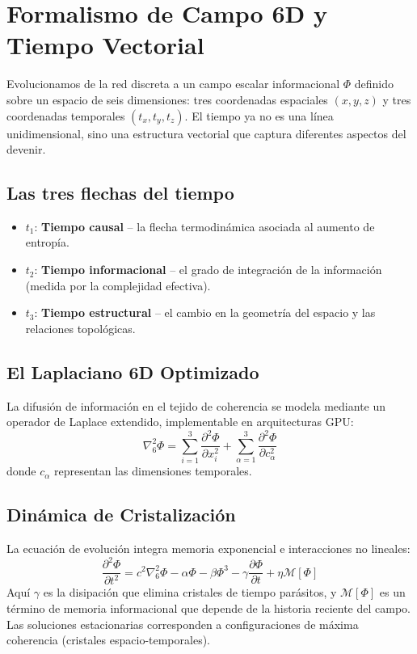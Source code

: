 \chapter{Formalismo de Campo 6D y Tiempo Vectorial}
Evolucionamos de la red discreta a un campo escalar informacional $\Phi$ definido sobre un espacio de seis dimensiones: tres coordenadas espaciales $(x,y,z)$ y tres coordenadas temporales $(t_x, t_y, t_z)$. El tiempo ya no es una línea unidimensional, sino una estructura vectorial que captura diferentes aspectos del devenir.

\section{Las tres flechas del tiempo}
\begin{itemize}
    \item $t_1$: \textbf{Tiempo causal} – la flecha termodinámica asociada al aumento de entropía.
    \item $t_2$: \textbf{Tiempo informacional} – el grado de integración de la información (medida por la complejidad efectiva).
    \item $t_3$: \textbf{Tiempo estructural} – el cambio en la geometría del espacio y las relaciones topológicas.
\end{itemize}

\section{El Laplaciano 6D Optimizado}
La difusión de información en el tejido de coherencia se modela mediante un operador de Laplace extendido, implementable en arquitecturas GPU:
\begin{equation}
\nabla^2_6 \Phi = \sum_{i=1}^{3} \frac{\partial^2 \Phi}{\partial x_i^2} + \sum_{\alpha=1}^{3} \frac{\partial^2 \Phi}{\partial c_\alpha^2}
\end{equation}
donde $c_\alpha$ representan las dimensiones temporales.

\section{Dinámica de Cristalización}
La ecuación de evolución integra memoria exponencial e interacciones no lineales:
\begin{equation}
\frac{\partial^2 \Phi}{\partial t^2} = c^2 \nabla^2_6 \Phi - \alpha \Phi - \beta \Phi^3 - \gamma \frac{\partial \Phi}{\partial t} + \eta \mathcal{M}[\Phi]
\end{equation}
Aquí $\gamma$ es la disipación que elimina cristales de tiempo parásitos, y $\mathcal{M}[\Phi]$ es un término de memoria informacional que depende de la historia reciente del campo. Las soluciones estacionarias corresponden a configuraciones de máxima coherencia (cristales espacio-temporales).
